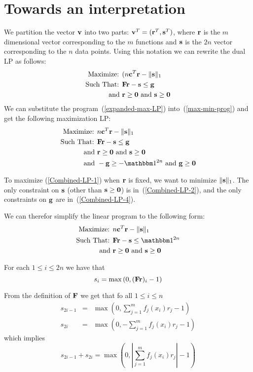 \documentclass{article}[12pt]
\begin{document}
\section{Towards an interpretation}
We partition the vector $\mathbf{v}$ into two parts: $\mathbf{v}^T = (\mathbf{r}^T,\mathbf{s}^T)$,
where $\mathbf{r}$ is the $m$ dimensional vector corresponding to the $m$
functions and $\mathbf{s}$ is the $2n$ vector corresponding to the $n$ data
points.  Using this notation we can rewrite the dual LP as follows:
\begin{eqnarray}
\mbox{Maximize: }& (n \mathbf{c}^T \mathbf{r}  - \| \mathbf{s} \|_1 \label{expanded-max-LP}\\
\mbox{Such That: }& \mathbf{F} \mathbf{r}  - \mathbf{s} \leq \mathbf{g} \notag \\
\mbox{ and } & \mathbf{r} \geq \mathbf{0} \mbox{ and } \mathbf{s} \geq \mathbf{0} \notag
\end{eqnarray}
We can substitute the program~(\ref{expanded-max-LP})
into~(\ref{max-min-prog}) and get the following maximization LP:
\begin{eqnarray}
\mbox{Maximize: }& n \vc^T \vr  - \| \vs \|_1 \label{Combined-LP-1}\\
\mbox{Such That: }& \vF \vr  - \vs \leq \vg  \label{Combined-LP-2}\\
\mbox{ and } & \vr \geq \vzero \mbox{ and } \vs \geq \vzero \label{Combined-LP-3} \\
\mbox{ and } &  -\vg \geq -\ones{2n} \mbox{ and } \vg \geq \vzero \label{Combined-LP-4}
\end{eqnarray}

To maximize (\ref{Combined-LP-1}) when $\mathbf{r}$ is fixed, we want to
minimize $\|\mathbf{s}\|_1$. The only constraint on $\mathbf{s}$ (other than $\mathbf{s}
\geq \mathbf{0}$) is in~(\ref{Combined-LP-2}), and the only constraints on
$\mathbf{g}$ are in~(\ref{Combined-LP-4}).

We can therefor simplify the linear program to the following form:
\begin{eqnarray}
\mbox{Maximize: }& n \vc^T \vr  - \| \vs \|_1 \label{condensed-LP-1}\\
\mbox{Such That: }& \vF \vr  - \vs \leq \ones{2n}  \label{Condensed-LP-2}\\
\mbox{ and } & \vr \geq \vzero \mbox{ and } \vs \geq \vzero \label{Condensed-LP-3} \\
\end{eqnarray}

For each $1 \leq i \leq 2n$ we have that
\[
s_i = \max \left(0,(\mathbf{F} \mathbf{r})_i -1 \right)
\]

From the definition of $\mathbf{F}$ we get that fo all $1 \leq i \leq n$
\begin{eqnarray*}
s_{2i-1} &=& \max \left(0,\sum_{j=1}^m f_j(x_i) r_j -1 \right) \\
s_{2i} &=& \max \left(0,-\sum_{j=1}^m f_j(x_i) r_j -1 \right)
\end{eqnarray*}
which implies 
\[
s_{2i-1}+s_{2i} = \max \left(0,\left| \sum_{j=1}^m f_j(x_i) r_j \right| -1 \right)
\]
\end{document}
